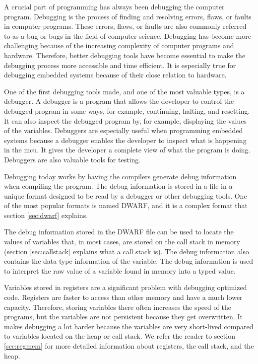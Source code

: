 A crucial part of programming has always been debugging the computer program.
Debugging is the process of finding and resolving errors, flaws, or faults in computer programs.
These errors, flaws, or faults are also commonly referred to as a bug or bugs in the field of computer science.
Debugging has become more challenging because of the increasing complexity of computer programs and hardware.
Therefore, better debugging tools have become essential to make the debugging process more accessible and time efficient.
It is especially true for debugging embedded systems because of their close relation to hardware.


One of the first debugging tools made, and one of the most valuable types, is a debugger.
A debugger is a program that allows the developer to control the debugged program in some ways, for example, continuing, halting, and resetting.
It can also inspect the debugged program by, for example, displaying the values of the variables.
Debuggers are especially useful when programming embedded systems because a debugger enables the developer to inspect what is happening in the \gls{mcu}.
It gives the developer a complete view of what the program is doing.
Debuggers are also valuable tools for testing.


Debugging today works by having the compilers generate debug information when compiling the program.
The debug information is stored in a file in a unique format designed to be read by a debugger or other debugging tools.
One of the most popular formats is named 
\gls{DWARF}, and it is a complex format that section \ref{sec:dwarf} explains.


The debug information stored in the \gls{DWARF} file can be used to locate the values of variables that, in most cases, are stored on the call stack in memory (section \ref{sec:callstack} explains what a call stack is).
The debug information also contains the data type information of the variable.
The debug information is used to interpret the raw value of a variable found in memory into a typed value.


Variables stored in registers are a significant problem with debugging optimized code.
Registers are faster to access than other memory and have a much lower capacity.
Therefore, storing variables there often increases the speed of the programs, but the variables are not persistent because they get overwritten.
It makes debugging a lot harder because the variables are very short-lived compared to variables located on the heap or call stack.
We refer the reader to section \ref{sec:regmem} for more detailed information about registers, the call stack, and the heap.


